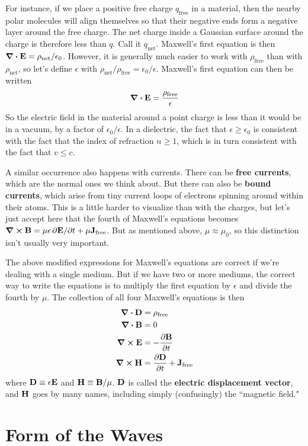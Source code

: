 For instance, if we place a positive free charge $q_\text{free}$ in a material, then the nearby polar molecules will align themselves so that their negative ends form a negative layer around the free charge. The net charge inside a Gaussian surface around the charge is therefore less than $q$. Call it $q_\text{net}$. Maxwell's first equation is then $\div\mathbf{E} = \rho_\text{net}/\epsilon_0$. However, it is generally much easier to work with $\rho_\text{free}$ than with $\rho_\text{net}$, so let's define $\epsilon$ with $\rho_\text{net}/\rho_\text{free} = \epsilon_0 / \epsilon$. Maxwell's first equation can then be written
\[ \div \mathbf{E} = \frac{\rho_\text{free}}{\epsilon} \]
So the electric field in the material around a point charge is less than it would be in a vacuum, by a factor of $\epsilon_0/\epsilon$. In a dielectric, the fact that $\epsilon \ge \epsilon_0$ is consistent with the fact that the index of refraction $n\ge 1$, which is in turn consistent with the fact that $v\le c$.

A similar occurrence also happens with currents. There can be \textbf{free currents}, which are the normal ones we think about. But there can also be \textbf{bound currents}, which arise from tiny current loops of electrons spinning around within their atoms. This is a little harder to visualize than with the charges, but let's just accept here that the fourth of Maxwell's equations becomes $\curl \mathbf{B} = \mu\epsilon \, \partial \mathbf{E}/\partial t + \mu \mathbf{J}_\text{free}$. But as mentioned above, $\mu\approx \mu_0$, so this distinction isn't usually very important.

The above modified expressions for Maxwell's equations are correct if we're dealing with a single medium. But if we have two or more mediums, the correct way to write the equations is to multiply the first equation by $\epsilon$ and divide the fourth by $\mu$. The collection of all four Maxwell's equations is then
\begin{align*}
    \div \mathbf{D} &= \rho_\text{free} \\
    \div \mathbf{B} &= 0 \\
    \curl \mathbf{E} &= -\pdv{\mathbf{B}}{t} \\
    \curl \mathbf{H} &= \pdv{\mathbf{D}}{t} + \mathbf{J}_\text{free}
\end{align*}
where $\mathbf{D} \equiv \epsilon \mathbf{E}$ and $\mathbf{H} \equiv \mathbf{B}/\mu$. $\mathbf{D}$ is called the \textbf{electric displacement vector}, and $\mathbf{H}$ goes by many names, including simply (confusingly) the ``magnetic field." 
\section{Form of the Waves}
